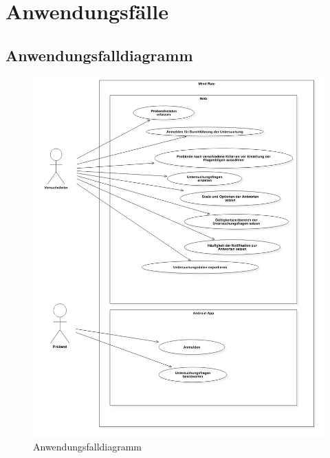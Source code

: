 \documentclass[a4paper]{scrreprt}
\begin{document}
        \section{Anwendungsf\"alle}

            \subsection{Anwendungsfalldiagramm}
                \vspace{0.4cm}
                \begin{figure}
                    \centering
                    \includegraphics[scale = 0.4]{UseCaseDiagram1.jpg}
                    \caption{Anwendungsfalldiagramm}
                \end{figure}


    \glsaddall
    \printglossaries

    \listoffigures
\end{document}
